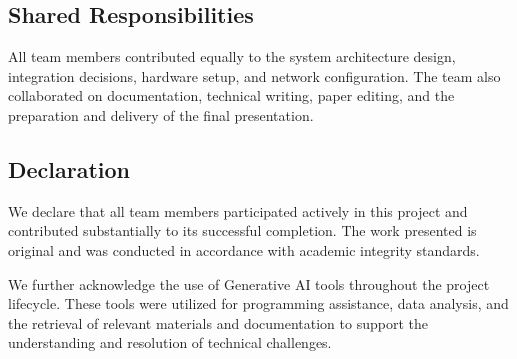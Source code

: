 \subsection*{Shared Responsibilities}
All team members contributed equally to the system architecture design, integration decisions, hardware setup, and network configuration. The team also collaborated on documentation, technical writing, paper editing, and the preparation and delivery of the final presentation.

\subsection*{Declaration}
We declare that all team members participated actively in this project and contributed substantially to its successful completion. The work presented is original and was conducted in accordance with academic integrity standards.

We further acknowledge the use of Generative AI tools throughout the project lifecycle. These tools were utilized for programming assistance, data analysis, and the retrieval of relevant materials and documentation to support the understanding and resolution of technical challenges.
